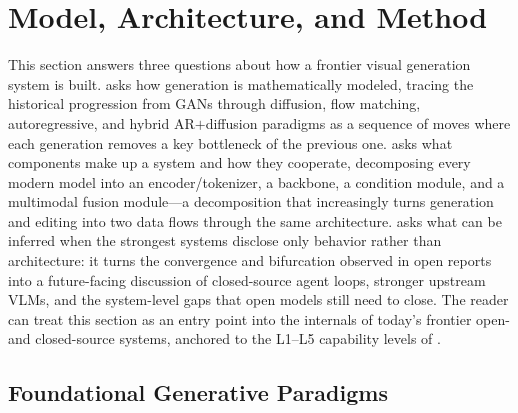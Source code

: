 \section{Model, Architecture, and Method}\label{sec:method}

This section answers three questions about how a frontier visual generation system is built.  asks how generation is mathematically modeled, tracing the historical progression from GANs through diffusion, flow matching, autoregressive, and hybrid AR$+$diffusion paradigms as a sequence of moves where each generation removes a key bottleneck of the previous one.  asks what components make up a system and how they cooperate, decomposing every modern model into an encoder/tokenizer, a backbone, a condition module, and a multimodal fusion module---a decomposition that increasingly turns generation and editing into two data flows through the same architecture.  asks what can be inferred when the strongest systems disclose only behavior rather than architecture: it turns the convergence and bifurcation observed in open reports into a future-facing discussion of closed-source agent loops, stronger upstream VLMs, and the system-level gaps that open models still need to close. The reader can treat this section as an entry point into the internals of today's frontier open- and closed-source systems, anchored to the L1--L5 capability levels of .

\subsection{Foundational Generative Paradigms}
\label{sec:model_arch}


